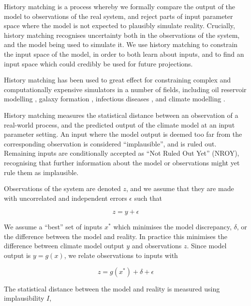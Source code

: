 \documentclass[gmd, manuscript]{copernicus}
\begin{document}
History matching is a process whereby we formally compare the output of the model to observations of the real system, and reject parts of input parameter space where the model is not expected to plausibly simulate reality. Crucially, history matching recognises uncertainty both in the observations of the system, and the model being used to simulate it. We use history matching to constrain the input space of the model, in order to both learn about inputs, and to find an input space which could credibly be used for future projections.

History matching has been used to great effect for constraining complex and computationally expensive simulators in a number of fields, including oil reservoir modelling \citep{craig1996strategies, craig1997pressure}, galaxy formation \citep{vernon2010galaxy, vernon2014observable}, infectious diseases \citep{andrianakis2015bayesian}, and climate modelling \citep{williamson2013history, williamson2015identifying, mcneall2020correcting}.

History matching measures the statistical distance between an observation of a real-world process, and the predicted output of the climate model at an input parameter setting. An input where the model output is deemed too far from the corresponding observation is considered ``implausible'', and is ruled out. Remaining inputs are conditionally accepted as ``Not Ruled Out Yet'' (NROY), recognising that further information about the model or observations might yet rule them as implausible.

Observations of the system are denoted $z$, and we assume that they are made with uncorrelated and independent errors $\epsilon$  such that

\begin{equation}
z = y+\epsilon
\end{equation}

We assume a ``best'' set of inputs $x^*$ which minimises the model discrepancy, $\delta$, or the difference between the model and reality. In practice this minimises the difference between climate model output $y$ and observations $z$. Since model output is $y = g(x)$, we relate observations to inputs with 

\begin{equation}
z = g(x^*) + \delta + \epsilon 
\end{equation}

The statistical distance between the model and reality is measured using  implausibility $I$,
\end{document}
